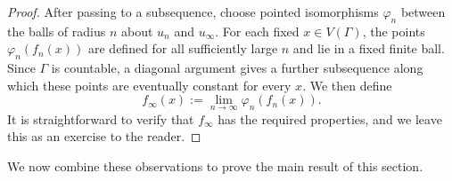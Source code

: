 \documentclass[a4paper]{amsart}
\begin{document}
\begin{proof}
After passing to a subsequence, choose pointed isomorphisms $\varphi_n$ between the balls of radius $n$ about $u_n$ and $u_\infty$. For each fixed $x\in V(\Gamma)$, the points $\varphi_n(f_n(x))$ are defined for all sufficiently large $n$ and lie in a fixed finite ball. Since $\Gamma$ is countable, a diagonal argument gives a further subsequence along which these points are eventually constant for every $x$. We then define
$$
f_\infty(x):=\lim_{n\to\infty}\varphi_n(f_n(x)).
$$
It is straightforward to verify that $f_\infty$ has the required properties, and we leave this as an exercise to the reader. 
\end{proof}



We now combine these observations to prove the main result of this section. 
\end{document}
